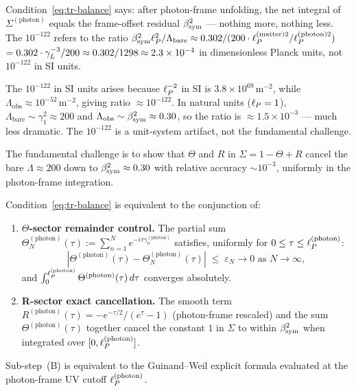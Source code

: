 \begin{remark}
\label{rem:open}
Condition~\eqref{eq:tr-balance} says: after photon-frame unfolding,
the net integral of $\Sigma^{(\mathrm{photon})}$ equals the frame-offset
residual $\beta_{\mathrm{sym}}^2$ — nothing more, nothing less. The $10^{-122}$ refers
to the ratio $\beta_{\mathrm{sym}}^2\ell_P^{2}/\Lambda_{\mathrm{bare}} \approx 0.302 /
(200\cdot\ell_P^{(\mathrm{matter})2}/\ell_P^{(\mathrm{photon})2})$
$= 0.302 \cdot \gamma_L^{-3} / 200 \approx 0.302/1298 \approx 2.3\times
10^{-4}$ in dimensionless Planck units, not $10^{-122}$ in SI units.

\medskip
\noindent The $10^{-122}$ in SI units arises because $\ell_P^{-2}$ in SI is
$3.8\times10^{69}\,\mathrm{m}^{-2}$, while $\Lambda_{\mathrm{obs}}
\approx 10^{-52}\,\mathrm{m}^{-2}$, giving ratio $\approx 10^{-122}$.
In natural units ($\ell_P=1$), $\Lambda_{\mathrm{bare}} \sim \gamma_1^2
\approx 200$ and $\Lambda_{\mathrm{obs}} \sim \beta_{\mathrm{sym}}^2 \approx 0.30$,
so the ratio is $\approx 1.5\times 10^{-3}$ — much less dramatic. The
$10^{-122}$ is a unit-system artifact, not the fundamental challenge.

\medskip
\noindent The fundamental challenge is to show that $\Theta$ and $R$ in
$\Sigma = 1 - \Theta + R$ cancel the bare $\Lambda \approx 200$ down to
$\beta_{\mathrm{sym}}^2 \approx 0.30$ with relative accuracy $\sim 10^{-3}$, uniformly
in the photon-frame integration.
\end{remark}


\begin{proposition}
\label{prop:open-steps}
Condition~\eqref{eq:tr-balance} is equivalent to the conjunction of:
\begin{enumerate}
\item[\textbf{(A)}] \textbf{$\Theta$-sector remainder control.}
 The partial sum $\Theta^{(\mathrm{photon})}_N(\tau) :=
 \sum_{n=1}^N e^{-i\tau\gamma_n^{(\mathrm{photon})}}$
 satisfies, uniformly for $0 \leq \tau \leq \ell_P^{(\mathrm{photon})}$:
 \[
 \left|\Theta^{(\mathrm{photon})}(\tau)
 - \Theta^{(\mathrm{photon})}_N(\tau)\right|
 \;\leq\; \varepsilon_N \to 0 \text{ as } N\to\infty,
 \]
 and $\int_0^{\ell_P^{(\mathrm{photon})}} \Theta^{(\mathrm{photon})}(\tau)\,d\tau$
 converges absolutely.
\item[\textbf{(B)}] \textbf{R-sector exact cancellation.}
 The smooth term $R^{(\mathrm{photon})}(\tau) = -e^{-\tau/2}/(e^\tau-1)$
 (photon-frame rescaled) and the sum
 $\Theta^{(\mathrm{photon})}(\tau)$ together cancel the constant $1$
 in $\Sigma$ to within $\beta_{\mathrm{sym}}^2$ when integrated over
 $[0, \ell_P^{(\mathrm{photon})}]$.
\end{enumerate}
Sub-step~(B) is equivalent to the Guinand--Weil explicit formula
evaluated at the photon-frame UV cutoff $\ell_P^{(\mathrm{photon})}$.
\end{proposition}

